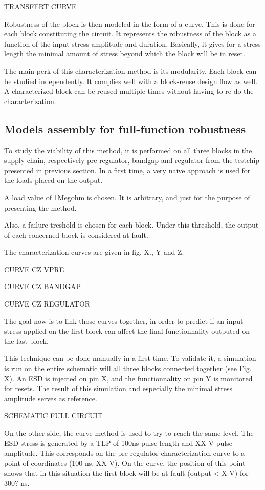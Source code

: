 TRANSFERT CURVE

Robustness of the block is then modeled in the form of a curve.
This is done for each block constituting the circuit.
It represents the robustness of the block as a function of the input stress amplitude and duration.
Basically, it gives for a stress length the minimal amount of stress beyond which the block will be in reset.

The main perk of this characterization method is its modularity.
Each block can be studied independently.
It complies well with a block-reuse design flow as well.
A characterized block can be reused multiple times without having to re-do the characterization.

\subsection{Models assembly for full-function robustness}

To study the viability of this method, it is performed on all three blocks in the supply chain, respectively pre-regulator,
bandgap and regulator from the testchip presented in previous section.
In a first time, a very naive approach is used for the loads placed on the output.

A load value of 1Megohm is chosen.
It is arbitrary, and just for the purpose of presenting the method.

Also, a failure treshold is chosen for each block.
Under this threshold, the output of each concerned block is considered at fault.

The characterization curves are given in fig. X., Y and Z.

CURVE CZ VPRE

CURVE CZ BANDGAP

CURVE CZ REGULATOR

The goal now is to link those curves together, in order to predict if an input
stress applied on the first block can affect the final functionnality outputed
on the last block.

This technique can be done manually in a first time. To validate it,
a simulation is run on the entire schematic will all three blocks
connected together (see Fig. X).
An ESD is injected on pin X, and the functionnality on pin Y is monitored for resets.
The result of this simulation and especially the minimal stress amplitude serves as reference.

SCHEMATIC FULL CIRCUIT

On the other side, the curve method is used to try to reach the same level.
The ESD stress is generated by a TLP of 100ns pulse length and XX V pulse amplitude.
This corresponds on the pre-regulator characterization curve to a point of coordinates (100 ns, XX V).
On the curve, the position of this point shows that in this situation the first block will be at fault (output < X V) for 300? ns.

